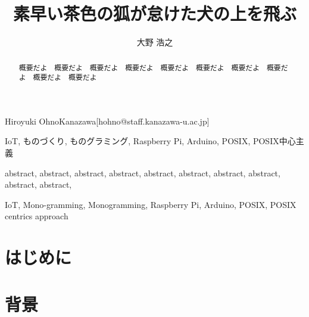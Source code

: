 \title{
  素早い茶色の狐が怠けた犬の上を飛ぶ
}



\author{大野 浩之}{Hiroyuki Ohno}{Kanazawa}[hohno@staff.kanazawa-u.ac.jp]


\begin{comment}
概要（90%
\end{comment}

\begin{abstract}
概要だよ　概要だよ　概要だよ　概要だよ　概要だよ　概要だよ　概要だよ　概要だよ　概要だよ　概要だよ　
\end{abstract}

\begin{jkeyword}
IoT, ものづくり, ものグラミング, Raspberry Pi, Arduino, POSIX, POSIX中心主義
\end{jkeyword}


\begin{eabstract}
abstract, abstract, abstract, abstract, abstract, abstract, abstract, abstract, abstract, abstract,
\end{eabstract}

\begin{ekeyword}
IoT, Mono-gramming, Monogramming, Raspberry Pi, Arduino, POSIX, POSIX centrics approach
\end{ekeyword}

\maketitle

\begin{comment}
1. はじめに（00%
\end{comment}
\section{はじめに}
\label{sec:01introduction}


\begin{comment}
2. 背景（00%
\end{comment}
\section{背景}
\label{sec:02background}


